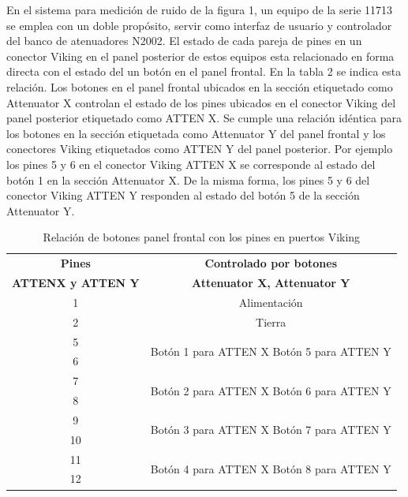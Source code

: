 En el sistema para medición de ruido de la figura 1, un equipo de la serie 11713 se emplea con un doble propósito, servir como interfaz de usuario y controlador del banco de atenuadores N2002. El estado de cada pareja de pines en un conector Viking en el panel posterior de estos equipos esta relacionado en forma directa con el estado del un botón en el panel frontal. En la tabla 2 se indica esta relación. Los botones en el panel frontal ubicados en la sección etiquetado como Attenuator X controlan el estado de los pines ubicados en el conector Viking del panel posterior etiquetado como ATTEN X. Se cumple una relación idéntica para los botones en la sección etiquetada como Attenuator Y del panel frontal y los conectores Viking etiquetados como ATTEN Y del panel posterior. Por ejemplo los pines 5 y 6 en el conector Viking ATTEN X se corresponde al estado del botón 1 en la sección Attenuator X. De la misma forma, los pines 5 y 6 del conector Viking ATTEN Y responden al estado del botón 5 de la sección Attenuator Y.

\begin{table}[h!]
	\centering
	\begin{tabular}{cc}
		\toprule
		\textbf{Pines} 				&	\textbf{Controlado por botones}			\\
		\textbf{ATTENX y ATTEN Y}	&	\textbf{Attenuator X, Attenuator Y} 	\\
		\midrule
		1	&	Alimentación 	\\
		\midrule
		2	&	Tierra 			\\
		\midrule		
		5	&	\multirow{2}{*}{Botón 1 para ATTEN X Botón 5 para ATTEN Y} \\
		6	&																		\\
		\midrule		
		7	&	\multirow{2}{*}{Botón 2 para ATTEN X Botón 6 para ATTEN Y}	\\
		8	&																		\\
		\midrule		
		9	&	\multirow{2}{*}{Botón 3 para ATTEN X Botón 7 para ATTEN Y}	\\	
		10	&													 					\\
		\midrule		
		11	&	\multirow{2}{*}{Botón 4 para ATTEN X Botón 8 para ATTEN Y}	\\
		12	&																		\\ 
																						 														
		\bottomrule		 
	\end{tabular}
	\caption{Relación de botones panel frontal con los pines en puertos Viking}
	\label{Tab:RelacionBotonesPuertosViking11713}
\end{table}


